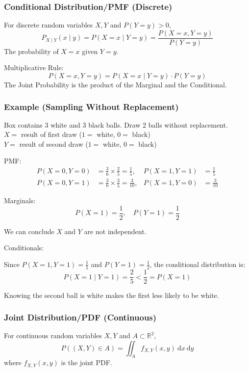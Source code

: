 \documentclass[../Probability.tex]{subfiles}
\begin{document}
\subsubsection{Conditional Distribution/PMF (Discrete)}
For discrete random variables $X,Y$ and $P(Y=y) > 0$,
\[P_{X\mid Y}(x\mid y) = P(X=x\mid Y=y) = \frac{P(X=x, Y=y)}{P(Y=y)}\]
The probability of $X=x$ given $Y=y$.

\medskip

\noindent Multiplicative Rule:
\[P(X=x, Y=y) = P(X=x\mid Y=y)\cdot P(Y=y)\]
The Joint Probability is the product of the Marginal and the Conditional.

\subsubsection{Example (Sampling Without Replacement)}

Box contains 3 white and 3 black balls. Draw 2 balls without replacement. \\
$X = $ result of first draw ($1 = $ white, $0 = $ black) \\
$Y = $ result of second draw ($1 = $ white, $0 = $ black)

\noindent PMF:
\begin{align*}
    P(X = 0, Y = 0) &= \frac{3}{6} \times \frac{2}{5} = \frac{1}{5}, & P(X = 1, Y = 1) &= \frac{1}{5} \\
    P(X = 0, Y = 1) &= \frac{3}{6} \times \frac{3}{5} = \frac{3}{10}, & P(X = 1, Y = 0) &= \frac{3}{10}
\end{align*}

\noindent Marginals:
\begin{equation*}
    P(X = 1) = \frac{1}{2}, \quad P(Y = 1) = \frac{1}{2}
\end{equation*}

\noindent We can conclude $X$ and $Y$ are not independent.

\bigskip

\noindent Conditionals:

\noindent Since $P(X = 1, Y = 1) = \frac{1}{5}$ and $P(Y = 1) = \frac{1}{2}$, the conditional distribution is:
\begin{equation*}
    P(X = 1 \mid Y = 1) = \frac{2}{5} < \frac{1}{2} = P(X=1)
\end{equation*}

\noindent Knowing the second ball is white makes the first less likely to be white.

\subsubsection{Joint Distribution/PDF (Continuous)}
For continuous random variables $X,Y$ and $A\subset \mathbb{R}^2$,
\[P((X,Y)\in A) = \iint_A f_{X,Y}(x,y)\:\mathrm{d}x\:\mathrm{d}y\]
where $f_{X,Y}(x,y)$ is the joint PDF.
\end{document}

